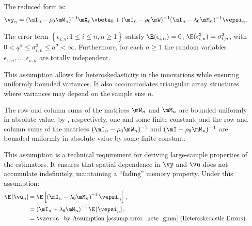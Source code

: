 \documentclass[english,12pt]{book}\usepackage[]{graphicx}\usepackage[]{xcolor}
\begin{document}
The reduced form is:
\begin{equation*}
\vy_n = (\mI_n - \rho_0\mW_n)^{-1}\mX_n\vbeta_0 +(\mI_n -\rho_0\mW)^{-1}(\mI_n - \lambda_0\mM_n)^{-1}\vepsi_n. 
\end{equation*}

% 


\begin{assumption}\label{assump:error_hete_gmm} 
	The error term  $\left\lbrace\epsilon_{i,n}: 1 \leq i \leq n, n\geq 1\right\rbrace$ satisfy $\E(\epsilon_{i,n}) = 0$, $\E(\epsilon_{i,n}^2) = \sigma^2_{i,n}$, with $0 < \underline{a}^\sigma \leq \sigma^2_{i,n}\leq \overline{a}^\sigma<\infty$. Furthermore, for each $n\geq 1$ the random variables $\epsilon_{1,n}, \ldots, \epsilon_{n,n}$ are totally independent.  
\end{assumption}

This assumption allows for heteroskedasticity in the innovations while ensuring uniformly bounded variances. It also accommodates triangular array structures where variances may depend on the sample size $n$. 

\begin{assumption}\label{assump:bounded_matrices_hetgmm}
		 The row and column sums of the matrices $\mW_n$ and $\mM_n$ are bounded uniformly in absolute value, by , respectively, one and some finite constant, and the row and column sums of the matrices $(\mI_n - \rho_0\mW_n)^{-1}$ and  $(\mI - \rho_0\mM_n)^{-1}$ are bounded uniformly in absolute value by some finite constant.
\end{assumption}	

This assumption is a technical requirement for deriving large-sample properties of the estimators. It ensures that spatial dependence in $\vy$ and $\vu$ does not accumulate indefinitely, maintaining a ``fading'' memory property. Under this assumption:
\begin{equation*}
\begin{aligned}
\E\left[\vu_n \right] & = \E\left[\left(\mI_n - \lambda_0 \mM_n\right)^{-1}\vepsi_n\right],  \\
             & = \left(\mI_n - \lambda_0 \mM_n\right)^{-1} \E\left[\vepsi_n\right], \\
             & = \vzeros \;\;\;\mbox{by Assumption \ref{assump:error_hete_gmm} (Heteroskedastic Errors)}.
\end{aligned}
\end{equation*}
\end{document}
